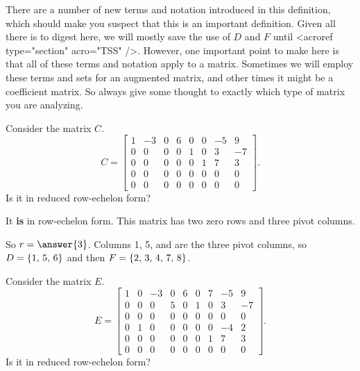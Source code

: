 \documentclass{ximera}
\begin{document}
There are a number of new terms and notation introduced in this
definition, which should make you suspect that this is an important
definition.  Given all there is to digest here, we will mostly save
the use of $D$ and $F$ until <acroref type="section" acro="TSS" />.
However, one important point to make here is that all of these terms
and notation apply to a matrix.  Sometimes we will employ these terms
and sets for an augmented matrix, and other times it might be a
coefficient matrix.  So always give some thought to exactly which type
of matrix you are analyzing.

\begin{example}
  Consider the matrix $C$.
  \[
    C=
    \begin{bmatrix}
      1&-3&0&6&0&0&-5&9\\
      0&0&0&0&1&0&3&-7\\
      0&0&0&0&0&1&7&3\\
      0&0&0&0&0&0&0&0\\
      0&0&0&0&0&0&0&0
    \end{bmatrix}.
  \]
  Is it in reduced row-echelon form?
  \begin{multipleChoice}
  \end{multipleChoice}
  
  \begin{feedback}
    It \textbf{is} in row-echelon form.  This matrix has two zero rows and three pivot columns.
  \end{feedback}
  
  So $r=\answer{3}$.  Columns 1, 5, and  are the three pivot columns, so $D=\left\{1,\,5,\,6\right\}$ and then $F=\left\{2,\,3,\,4,\,7,\,8\right\}$.
\end{example}

\begin{example}
  Consider the matrix $E$.
  \[
    E=
    \begin{bmatrix}
      1&0&-3&0&6&0&7&-5&9\\
      0&0&0&5&0&1&0&3&-7\\
      0&0&0&0&0&0&0&0&0\\
      0&1&0&0&0&0&0&-4&2\\
      0&0&0&0&0&0&1&7&3\\
      0&0&0&0&0&0&0&0&0
    \end{bmatrix}.
  \]
  Is it in reduced row-echelon form?
  \begin{multipleChoice}
  \end{multipleChoice}
\end{example}
\end{document}

